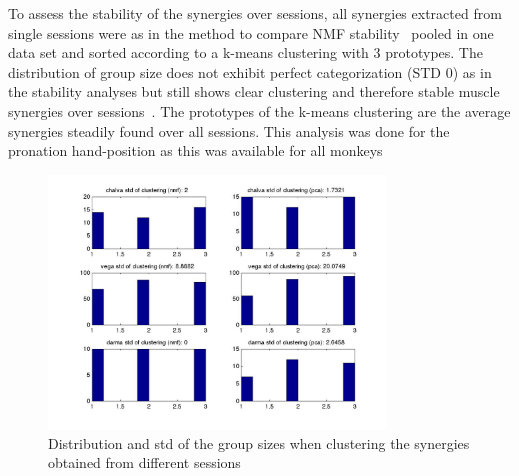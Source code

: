 To assess the stability of the synergies over sessions, all synergies extracted from single sessions were as in the method to compare NMF stability~ pooled in one data set and sorted according to a k-means clustering with 3 prototypes. The distribution of group size does not exhibit perfect categorization (STD 0) as in the stability analyses but still shows clear clustering and therefore stable muscle synergies over sessions~. The prototypes of the k-means clustering are the average synergies steadily found over all sessions. This analysis was done for the pronation hand-position as this was available for all monkeys


\begin{figure}[ht]
    \centering
    \includegraphics[width=0.8\textwidth]{images/syn_consist_sessions_std.jpg}
    \caption{Distribution and std of the group sizes when clustering the synergies obtained from different sessions}
    \label{sg:fig:images_syn_consist_sessions_std}
\end{figure}


